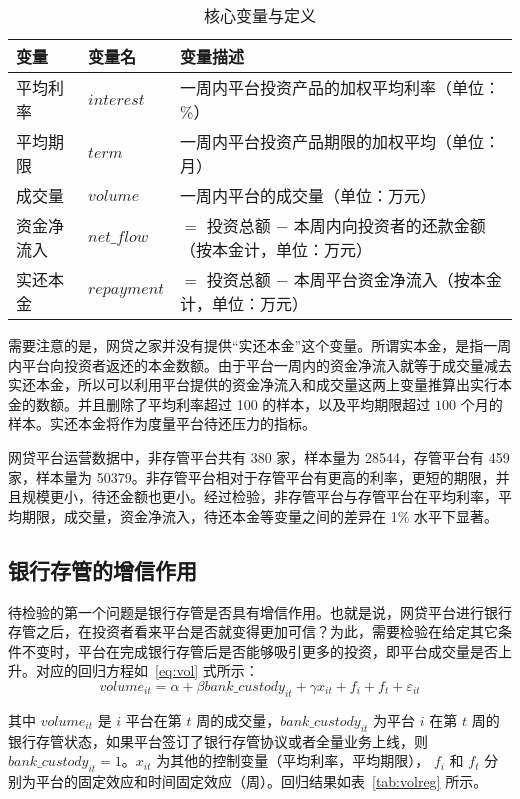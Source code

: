 \documentclass[lang=cn,11pt]{elegantpaper}
\begin{document}
\begin{table}[htbp]
  \centering
  \caption{核心变量与定义}
    \begin{tabular}{lll}
    \toprule
    变量    &变量名 & 变量描述 \\
    \midrule
    平均利率  & $interest$ & 一周内平台投资产品的加权平均利率（单位：\%）\\
    平均期限  & $term$  &一周内平台投资产品期限的加权平均（单位：月） \\
    成交量   & $volume$ & 一周内平台的成交量（单位：万元） \\
    资金净流入 & $net\_flow$ & $=$ 投资总额 $-$ 本周内向投资者的还款金额（按本金计，单位：万元） \\
    实还本金  & $repayment$ & $=$ 投资总额 $-$ 本周平台资金净流入（按本金计，单位：万元） \\
    \bottomrule
    \end{tabular}%
  \label{tab:var}%
\end{table}%


需要注意的是，网贷之家并没有提供“实还本金”这个变量。所谓实本金，是指一周内平台向投资者返还的本金数额。由于平台一周内的资金净流入就等于成交量减去实还本金，所以可以利用平台提供的资金净流入和成交量这两上变量推算出实行本金的数额。并且删除了平均利率超过 100 的样本，以及平均期限超过 $100$ 个月的样本。实还本金将作为度量平台待还压力的指标。

网贷平台运营数据中，非存管平台共有 380 家，样本量为 28544，存管平台有 459 家，样本量为 50379。非存管平台相对于存管平台有更高的利率，更短的期限，并且规模更小，待还金额也更小。经过检验，非存管平台与存管平台在平均利率，平均期限，成交量，资金净流入，待还本金等变量之间的差异在 1\% 水平下显著。

\subsection{银行存管的增信作用}

待检验的第一个问题是银行存管是否具有增信作用。也就是说，网贷平台进行银行存管之后，在投资者看来平台是否就变得更加可信？为此，需要检验在给定其它条件不变时，平台在完成银行存管后是否能够吸引更多的投资，即平台成交量是否上升。对应的回归方程如~\eqref{eq:vol} 式所示：
\begin{equation}\label{eq:vol}
volume_{it} = \alpha + \beta bank\_custody_{it} + \gamma x_{it} + f_i + f_t + \varepsilon_{it}
\end{equation}

其中 $volume_{it}$ 是 $i$ 平台在第 $t$ 周的成交量，$bank\_custody_{it}$ 为平台 $i$ 在第 $t$ 周的银行存管状态，如果平台签订了银行存管协议或者全量业务上线，则  $bank\_custody_{it} = 1$。$x_{it}$ 为其他的控制变量（平均利率，平均期限），  $f_i$ 和  $f_t$ 分别为平台的固定效应和时间固定效应（周）。回归结果如表~\ref{tab:volreg} 所示。
\end{document}
